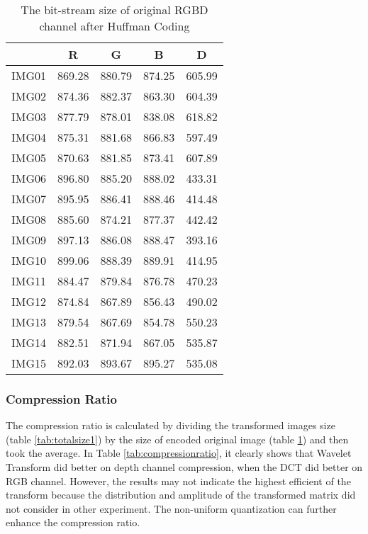 \begin{table}
\center
\small \begin{tabular}{|l|r|r|r|r|}\hline
&\multicolumn{1}{|c|}{R} & \multicolumn{1}{|c|}{G} & \multicolumn{1}{|c|}{B} & \multicolumn{1}{|c|}{D} \\\hline 
IMG01 & 869.28 & 880.79 & 874.25 & 605.99 \\\hline 
IMG02 & 874.36 & 882.37 & 863.30 & 604.39 \\\hline 
IMG03 & 877.79 & 878.01 & 838.08 & 618.82 \\\hline 
IMG04 & 875.31 & 881.68 & 866.83 & 597.49 \\\hline 
IMG05 & 870.63 & 881.85 & 873.41 & 607.89 \\\hline 
IMG06 & 896.80 & 885.20 & 888.02 & 433.31 \\\hline 
IMG07 & 895.95 & 886.41 & 888.46 & 414.48 \\\hline 
IMG08 & 885.60 & 874.21 & 877.37 & 442.42 \\\hline 
IMG09 & 897.13 & 886.08 & 888.47 & 393.16 \\\hline 
IMG10 & 899.06 & 888.39 & 889.91 & 414.95 \\\hline 
IMG11 & 884.47 & 879.84 & 876.78 & 470.23 \\\hline 
IMG12 & 874.84 & 867.89 & 856.43 & 490.02 \\\hline 
IMG13 & 879.54 & 867.69 & 854.78 & 550.23 \\\hline 
IMG14 & 882.51 & 871.94 & 867.05 & 535.87 \\\hline 
IMG15 & 892.03 & 893.67 & 895.27 & 535.08 \\\hline 
\end{tabular}
\caption{The bit-stream size of original RGBD channel after Huffman Coding}
\label{tab:totalsize2}
\end{table}


\subsubsection{Compression Ratio}
The compression ratio is calculated by dividing the transformed images size (table \ref{tab:totalsize1})
by the size of encoded original image (table \ref{tab:totalsize2}) and then took the average. In Table 
\ref{tab:compressionratio}, it clearly shows that Wavelet Transform did better on depth channel compression, 
when the DCT did better on RGB channel. However, the results may not indicate 
the highest efficient of the transform because the distribution and amplitude of 
the transformed matrix did not consider in other experiment. The non-uniform 
quantization can further enhance the compression ratio.

